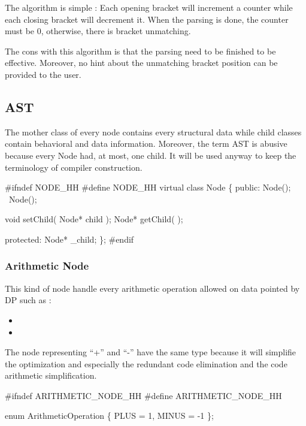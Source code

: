 The algorithm is simple : Each opening bracket will increment a counter while each closing bracket will decrement it. When the parsing is done, the counter must be $0$, otherwise, there is bracket unmatching. 

\newpar The cons with this algorithm is that the parsing need to be finished to be effective. Moreover, no hint about the unmatching bracket position can be provided to the user.

\subsection{AST}
The mother class of every node contains every structural data while child classes contain behavioral and data information. Moreover, the term \gls{AST} is abusive because every Node had, at most, one child. It will be used anyway to keep the terminology of compiler construction.

\nwenddocs{}\endmoddef\nwstartdeflinemarkup\nwenddeflinemarkup
#ifndef NODE_HH
#define NODE_HH
virtual class Node \{
        public:
                Node();
                ~Node();

                void setChild( Node* child );
                Node* getChild( );

        protected:
                Node* _child;
\};
#endif
\nwendcode{}\nwdocspar

\subsubsection{Arithmetic Node}
This kind of node handle every arithmetic operation allowed on data pointed by \gls{DP} such as :
\begin{itemize}
        \item {}
        \item {}
\end{itemize}

The node representing ``+'' and ``-'' have the same type because it will simplifie the optimization and especially the redundant code elimination and the code arithmetic simplification. 

\nwenddocs{}\endmoddef\nwstartdeflinemarkup\nwenddeflinemarkup
#ifndef ARITHMETIC_NODE_HH
#define ARITHMETIC_NODE_HH

enum ArithmeticOperation \{ 
        PLUS    = 1,
        MINUS   = -1
\};

